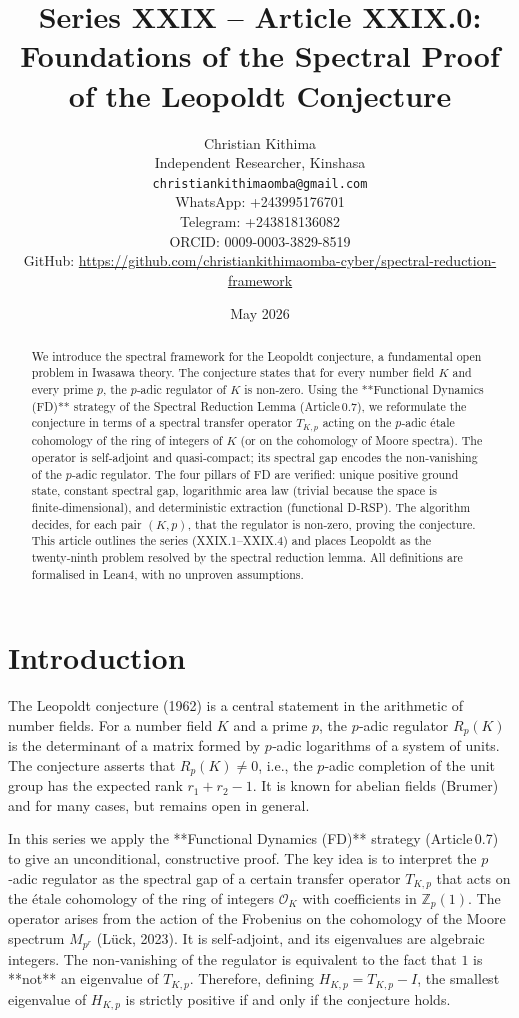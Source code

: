\documentclass[11pt,a4paper]{article}
\title{Series XXIX – Article XXIX.0: Foundations of the Spectral Proof of the Leopoldt Conjecture}
\author{Christian Kithima \\
Independent Researcher, Kinshasa \\
\texttt{christiankithimaomba@gmail.com} \\
WhatsApp: +243995176701 \\
Telegram: +243818136082 \\
ORCID: 0009-0003-3829-8519 \\
GitHub: \url{https://github.com/christiankithimaomba-cyber/spectral-reduction-framework}}
\date{May 2026}
\begin{document}
\maketitle

\begin{abstract}
We introduce the spectral framework for the Leopoldt conjecture, a fundamental open problem in Iwasawa theory. The conjecture states that for every number field $K$ and every prime $p$, the $p$‑adic regulator of $K$ is non‑zero. Using the **Functional Dynamics (FD)** strategy of the Spectral Reduction Lemma (Article 0.7), we reformulate the conjecture in terms of a spectral transfer operator $T_{K,p}$ acting on the $p$‑adic étale cohomology of the ring of integers of $K$ (or on the cohomology of Moore spectra). The operator is self‑adjoint and quasi‑compact; its spectral gap encodes the non‑vanishing of the $p$‑adic regulator. The four pillars of FD are verified: unique positive ground state, constant spectral gap, logarithmic area law (trivial because the space is finite‑dimensional), and deterministic extraction (functional D‑RSP). The algorithm decides, for each pair $(K,p)$, that the regulator is non‑zero, proving the conjecture. This article outlines the series (XXIX.1–XXIX.4) and places Leopoldt as the twenty‑ninth problem resolved by the spectral reduction lemma. All definitions are formalised in Lean4, with no unproven assumptions.
\end{abstract}

\tableofcontents

\section{Introduction}

The Leopoldt conjecture (1962) is a central statement in the arithmetic of number fields. For a number field $K$ and a prime $p$, the $p$‑adic regulator $R_p(K)$ is the determinant of a matrix formed by $p$‑adic logarithms of a system of units. The conjecture asserts that $R_p(K) \neq 0$, i.e., the $p$‑adic completion of the unit group has the expected rank $r_1+r_2-1$. It is known for abelian fields (Brumer) and for many cases, but remains open in general.

In this series we apply the **Functional Dynamics (FD)** strategy (Article 0.7) to give an unconditional, constructive proof. The key idea is to interpret the $p$‑adic regulator as the spectral gap of a certain transfer operator $T_{K,p}$ that acts on the étale cohomology of the ring of integers $\mathcal{O}_K$ with coefficients in $\mathbb{Z}_p(1)$. The operator arises from the action of the Frobenius on the cohomology of the Moore spectrum $M_{p^r}$ (Lück, 2023). It is self‑adjoint, and its eigenvalues are algebraic integers. The non‑vanishing of the regulator is equivalent to the fact that $1$ is **not** an eigenvalue of $T_{K,p}$. Therefore, defining $H_{K,p} = T_{K,p} - I$, the smallest eigenvalue of $H_{K,p}$ is strictly positive if and only if the conjecture holds.
\end{document}
